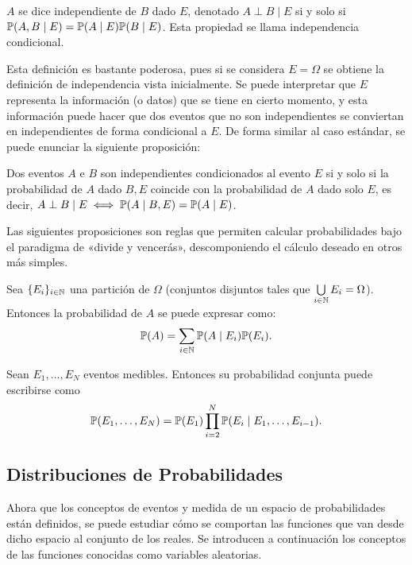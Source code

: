 \begin{definition}
	\(A\) se dice independiente de \(B\) dado \(E\), denotado \(A \perp B \mid E\) si y solo si \(\mathbb{P}(A, B \mid E) = \mathbb{P}(A \mid E) \mathbb{P}(B \mid E)\). Esta propiedad se llama independencia condicional.
\end{definition}
Esta definición es bastante poderosa, pues si se considera \(E = \Omega\) se obtiene la definición de independencia vista inicialmente. Se puede interpretar que \(E\) representa la información (o datos) que se tiene en cierto momento, y esta información puede hacer que dos eventos que no son independientes se conviertan en independientes de forma condicional a \(E\). De forma similar al caso estándar, se puede enunciar la siguiente proposición:
\begin{proposition}
	Dos eventos \(A\) e \(B\) son independientes condicionados al evento \(E\) si y solo si la probabilidad de \(A\) dado \(B, E\) coincide con la probabilidad de \(A\) dado solo \(E\), es decir, \(A \perp B \mid E \iff \mathbb{P} (A \mid B, E) = \mathbb{P} (A \mid E)\).
\end{proposition}

Las siguientes proposiciones son reglas que permiten calcular probabilidades bajo el paradigma de «divide y vencerás», descomponiendo el cálculo deseado en otros más simples.
\begin{proposition}
	Sea \(\{E_i\}_{i \in \mathbb{N}}\) una partición de \(\Omega\) (conjuntos disjuntos tales que \(\bigcup\limits_{i\in \mathbb{N}} E_i = \Omega\)). Entonces la probabilidad de \(A\) se puede expresar como:
	\[\mathbb{P}(A) = \sum_{i \in \mathbb{N}} \mathbb{P}(A \mid E_i) \mathbb{P}(E_i).\]
\end{proposition}

\begin{proposition}
	Sean \(E_1, \dotsc, E_N\) eventos medibles. Entonces su probabilidad conjunta puede escribirse como
	\[\mathbb{P} (E_1, \dotsc, E_N) = \mathbb{P}(E_1) \prod_{i=2}^N \mathbb{P} (E_i \mid E_1, \dotsc, E_{i-1}).\]
\end{proposition}

\subsection{Distribuciones de Probabilidades}
\label{sec:distributions}
Ahora que los conceptos de eventos y medida de un espacio de probabilidades están definidos, se puede estudiar cómo se comportan las funciones que van desde dicho espacio al conjunto de los reales. Se introducen a continuación los conceptos de las funciones conocidas como variables aleatorias.

